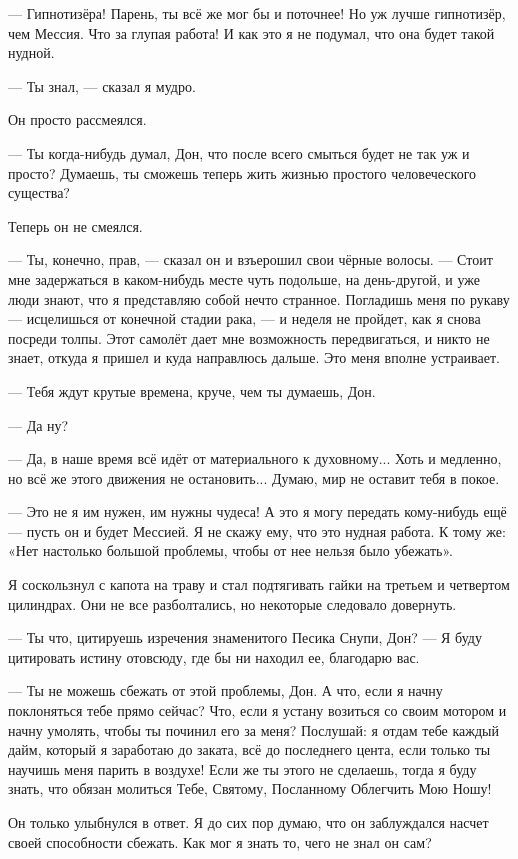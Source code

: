 --- Гипнотизёра! Парень, ты всё же мог бы и поточнее! Но уж лучше гипнотизёр, чем Мессия. Что за глупая работа! И как это я не подумал, что она будет такой нудной.

--- Ты знал, --- сказал я мудро.

Он просто рассмеялся.

--- Ты когда-нибудь думал, Дон, что после всего смыться будет не так уж и просто? Думаешь, ты сможешь теперь жить жизнью простого человеческого существа?

Теперь он не смеялся.

--- Ты, конечно, прав, --- сказал он и взъерошил свои чёрные волосы. --- Стоит мне задержаться в каком-нибудь месте чуть подольше, на день-другой, и уже люди знают, что я представляю собой нечто странное. Погладишь меня по рукаву --- исцелишься от конечной стадии рака, --- и неделя не пройдет, как я снова посреди толпы. Этот самолёт дает мне возможность передвигаться, и никто не знает, откуда я пришел и куда направлюсь дальше. Это меня вполне устраивает.

--- Тебя ждут крутые времена, круче, чем ты думаешь, Дон.

--- Да ну?

--- Да, в наше время всё идёт от материального к духовному... Хоть и медленно, но всё же этого
движения не остановить... Думаю, мир не оставит тебя в покое.

--- Это не я им нужен, им нужны чудеса! А это я могу передать кому-нибудь ещё --- пусть он и будет Мессией. Я не скажу ему, что это нудная работа. К тому же: «Нет настолько большой проблемы, чтобы от нее нельзя было убежать».

Я соскользнул с капота на траву и стал подтягивать гайки на третьем и четвертом цилиндрах. Они не все разболтались, но некоторые следовало довернуть.

--- Ты что, цитируешь изречения знаменитого Песика Снупи, Дон?
--- Я буду цитировать истину отовсюду, где бы ни находил ее, благодарю вас.

--- Ты не можешь сбежать от этой проблемы, Дон. А что, если я начну поклоняться тебе прямо сейчас?
Что, если я устану возиться со своим мотором и начну умолять, чтобы ты починил его за меня?
Послушай: я отдам тебе каждый дайм, который я заработаю до заката, всё до последнего цента, если
только ты научишь меня парить в воздухе! Если же ты этого не сделаешь, тогда я буду знать, что
обязан молиться Тебе, Святому, Посланному Облегчить Мою Ношу!

Он только улыбнулся в ответ. Я до сих пор думаю, что он заблуждался насчет своей способности сбежать. Как мог я знать то, чего не знал он сам?

